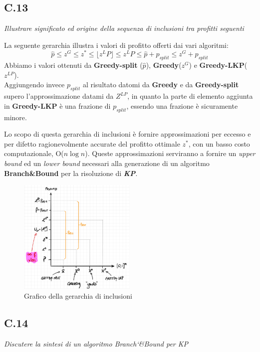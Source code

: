 \documentclass[a4paper]{article}
\newcommand{\imp}[1]{\textbf{\textit{#1}}}
\begin{document}
\subsection{C.13}
\label{SEC:C.13}
\emph{Illustrare significato ed origine della sequenza di inclusioni tra profitti seguenti}


La seguente gerarchia illustra i valori di profitto offerti dai vari algoritmi:
$$\hat p \leq z^G \leq z^* \leq \lfloor z^LP \rfloor  \leq z^LP \leq \hat p + p_{split} \leq z^G + p_{split}$$
Abbiamo i valori ottenuti da \textbf{Greedy-split} ($\hat p$), \textbf{Greedy}($z^G$) e \textbf{Greedy-LKP}($z^{LP}$).\\
Aggiungendo invece $p_{split}$ al risultato datomi da \textbf{Greedy} e da \textbf{Greedy-split} supero l'approssimazione datami da $Z^{LP}$, in quanto la parte di elemento aggiunta in \textbf{Greedy-LKP} è una frazione di $p_{split}$, essendo una frazione è sicuramente minore.

Lo scopo di questa gerarchia di inclusioni è fornire approssimazioni per eccesso e per difetto ragionevolmente accurate del profitto ottimale $z^*$, con un basso costo computazionale, O($n\log n$).
Queste approssimazioni serviranno a fornire un \textit{upper bound} ed un \textit{lower bound} necessari alla generazione di un algoritmo \textbf{Branch\&Bound} per la risoluzione di \imp{KP}.\\
\begin{figure}[!ht]
\centering
\includegraphics[width=0.5\textwidth]{./img/C_13.png}
\caption{Grafico della gerarchia di inclusioni} \label{FIG:C_13}
\end{figure}
\subsection{C.14}
\emph{Discutere la sintesi di un algoritmo Branch\char`&Bound per KP}
\end{document}
